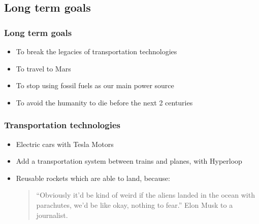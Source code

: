 \subsection{Long term goals}
\begin{frame}
\frametitle{Long term goals}
\begin{itemize}
    \itemsep1.5em
    \item To break the legacies of transportation technologies
    \item To travel to Mars
    \item To stop using fossil fuels as our main power source
    \item To avoid the humanity to die before the next 2 centuries
\end{itemize}
\end{frame}


\begin{frame}
\frametitle{Transportation technologies}
\begin{itemize}
    \itemsep1em
    \item Electric cars with Tesla Motors
    \item Add a transportation system between trains and planes, with
        Hyperloop
    \item Reusable rockets which are able to land, because:
        \begin{quote}
            ``Obviously it'd be kind of weird if the aliens landed in the ocean
            with parachutes, we'd be like okay, nothing to fear.'' Elon Musk to
            a journalist.
        \end{quote}
\end{itemize}
\end{frame}
